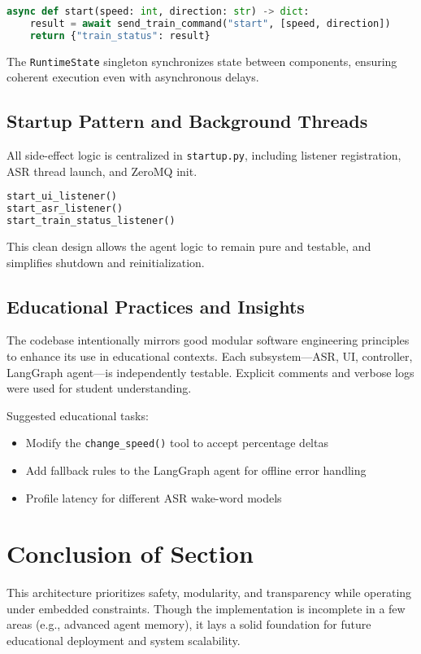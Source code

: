 \begin{lstlisting}[language=Python, caption=Train control tool call]
async def start(speed: int, direction: str) -> dict:
    result = await send_train_command("start", [speed, direction])
    return {"train_status": result}
\end{lstlisting}

The \texttt{RuntimeState} singleton synchronizes state between components, ensuring coherent execution even with asynchronous delays.

\subsection{Startup Pattern and Background Threads}

All side-effect logic is centralized in \texttt{startup.py}, including listener registration, ASR thread launch, and ZeroMQ init.

\begin{lstlisting}[language=Python, caption=Startup orchestration]
start_ui_listener()
start_asr_listener()
start_train_status_listener()
\end{lstlisting}

This clean design allows the agent logic to remain pure and testable, and simplifies shutdown and reinitialization.

\subsection{Educational Practices and Insights}

The codebase intentionally mirrors good modular software engineering principles to enhance its use in educational contexts. Each subsystem—ASR, UI, controller, LangGraph agent—is independently testable. Explicit comments and verbose logs were used for student understanding.

Suggested educational tasks:

\begin{itemize}
    \item Modify the \texttt{change\_speed()} tool to accept percentage deltas
    \item Add fallback rules to the LangGraph agent for offline error handling
    \item Profile latency for different ASR wake-word models
\end{itemize}

\section{Conclusion of Section}

This architecture prioritizes safety, modularity, and transparency while operating under embedded constraints. Though the implementation is incomplete in a few areas (e.g., advanced agent memory), it lays a solid foundation for future educational deployment and system scalability.
